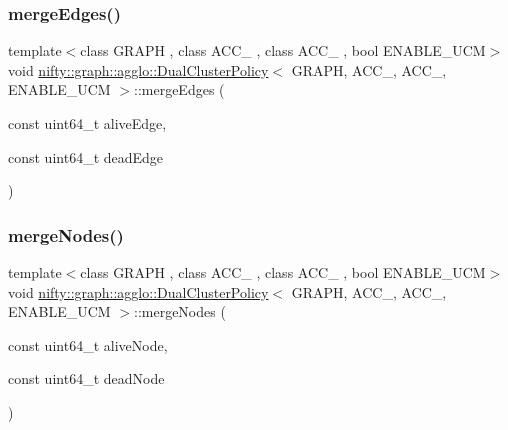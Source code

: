 \mbox{\label{classnifty_1_1graph_1_1agglo_1_1DualClusterPolicy_a0f986a69135f3b76cf1ffd5852b8d7a0}} 
\subsubsection{\texorpdfstring{merge\+Edges()}{mergeEdges()}}
{\footnotesize\ttfamily template$<$class G\+R\+A\+PH , class A\+C\+C\+\_ , class A\+C\+C\+\_ , bool E\+N\+A\+B\+L\+E\+\_\+\+U\+CM$>$ \\
void \hyperlink{classnifty_1_1graph_1_1agglo_1_1DualClusterPolicy}{nifty\+::graph\+::agglo\+::\+Dual\+Cluster\+Policy}$<$ G\+R\+A\+PH, A\+C\+C\+\_, A\+C\+C\+\_, E\+N\+A\+B\+L\+E\+\_\+\+U\+CM $>$\+::merge\+Edges (\begin{DoxyParamCaption}\item[{const uint64\+\_\+t}]{alive\+Edge,  }\item[{const uint64\+\_\+t}]{dead\+Edge }\end{DoxyParamCaption})\hspace{0.3cm}{\ttfamily [inline]}}

\mbox{\label{classnifty_1_1graph_1_1agglo_1_1DualClusterPolicy_a8c7aa0c86c9ec848a46dbe547f4a36d1}} 
\subsubsection{\texorpdfstring{merge\+Nodes()}{mergeNodes()}}
{\footnotesize\ttfamily template$<$class G\+R\+A\+PH , class A\+C\+C\+\_ , class A\+C\+C\+\_ , bool E\+N\+A\+B\+L\+E\+\_\+\+U\+CM$>$ \\
void \hyperlink{classnifty_1_1graph_1_1agglo_1_1DualClusterPolicy}{nifty\+::graph\+::agglo\+::\+Dual\+Cluster\+Policy}$<$ G\+R\+A\+PH, A\+C\+C\+\_, A\+C\+C\+\_, E\+N\+A\+B\+L\+E\+\_\+\+U\+CM $>$\+::merge\+Nodes (\begin{DoxyParamCaption}\item[{const uint64\+\_\+t}]{alive\+Node,  }\item[{const uint64\+\_\+t}]{dead\+Node }\end{DoxyParamCaption})\hspace{0.3cm}{\ttfamily [inline]}}



